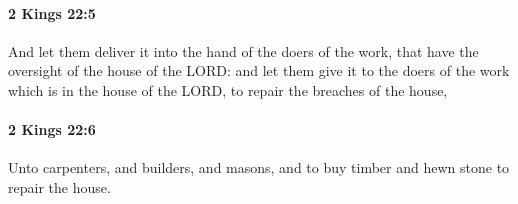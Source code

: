 		\paragraph{2 Kings 22:5} %
			\label{2KINGS-22-5}

			And let them deliver it into the hand of the doers of the work, that have the oversight of the house of the LORD: and let them give it to the doers of the work which is in the house of the LORD, to repair the breaches of the house,


		\paragraph{2 Kings 22:6} %
			\label{2KINGS-22-6}

			Unto carpenters, and builders, and masons, and to buy timber and hewn stone to repair the house.


